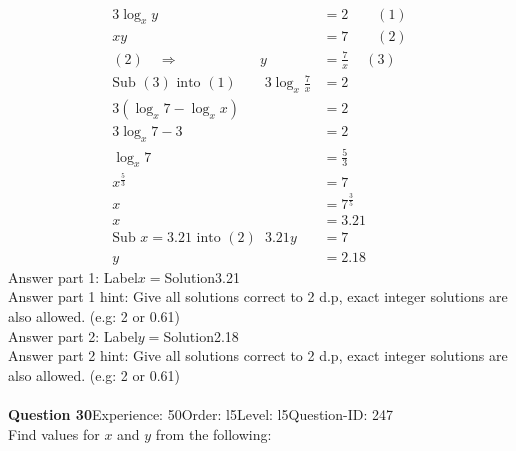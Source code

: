 \documentclass{article}
\begin{document}
\\[-35pt]\begin{align*}
3\log_{x}y&=2\qquad (1)\\[2pt]
xy&=7\qquad (2)\\[2pt]
(2) \quad\Rightarrow\hspace{69pt} y&=\displaystyle\frac{7}{x}\hspace{14pt} (3)\\[2pt]
\text{Sub}\,\,(3)\,\,\text{into}\,\,(1)\qquad 3\log_{x}\displaystyle\frac{7}{x}&=2\\[2pt]
3(\log_{x}7-\log_{x}x)&=2\\[2pt]
3\log_{x}7-3&=2\\[2pt]
\log_{x}7&=\displaystyle\frac{5}{3}\\[2pt]
x^{\frac{5}{3}}&=7\\[2pt]
x&=7^{\frac{3}{5}}\\[2pt]
x&=3.21\\[12pt]
\text{Sub}\,\,x=3.21\,\,\text{into}\,\,(2)\hspace{7pt} 3.21y&=7\\[2pt]
y&=2.18
\end{align*}
Answer part 1: \hspace{10pt}Label\hspace{10pt}$x=$\hspace{10pt}Solution\hspace{10pt}3.21\\
Answer part 1 hint: \hspace{15pt}Give all solutions correct to 2 d.p, exact integer solutions are also allowed. (e.g: 2 or 0.61)\\
Answer part 2: \hspace{10pt}Label\hspace{10pt}$y=$\hspace{10pt}Solution\hspace{10pt}2.18\\
Answer part 2 hint: \hspace{15pt}Give all solutions correct to 2 d.p, exact integer solutions are also allowed. (e.g: 2 or 0.61)\\
\\[4pt]
\noindent\textbf{Question 30}\hspace{20pt}Experience: 50\hspace{20pt}Order: l5\hspace{20pt}Level: l5\hspace{20pt}Question-ID: 247\\[2pt]
Find values for $x$ and $y$ from the following:
\end{document}

